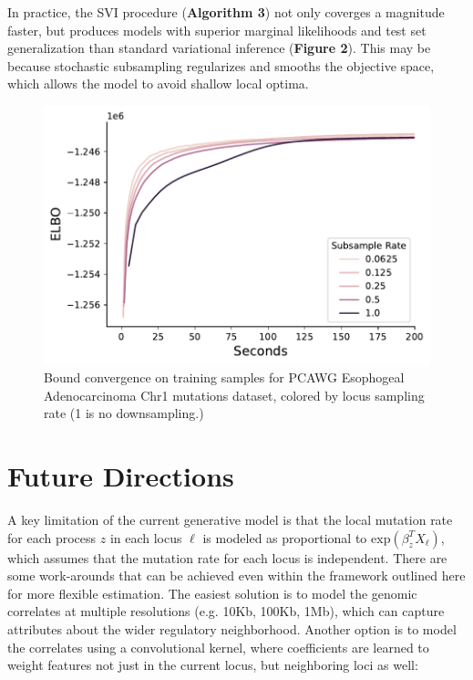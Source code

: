 \documentclass{article}
\begin{document}
In practice, the SVI procedure (\textbf{Algorithm 3}) not only coverges a magnitude faster, but produces models with superior marginal likelihoods and test set generalization than standard variational inference (\textbf{Figure 2}). This may be because stochastic subsampling regularizes and smooths the objective space, which allows the model to avoid shallow local optima.

\begin{figure}[!htb] \label{svi_fig}
\caption{Bound convergence on training samples for PCAWG Esophogeal Adenocarcinoma Chr1 mutations dataset, colored by locus sampling rate (1 is no downsampling.)}
\centering
\includegraphics[scale=0.5]{svi_subsampling.pdf}
\end{figure}

\section{Future Directions}

A key limitation of the current generative model is that the local mutation rate for each process $z$ in each locus $\ell$ is modeled as proportional to $\textrm{exp}(\beta_z^T X_\ell)$, which assumes that the mutation rate for each locus is independent. There are some work-arounds that can be achieved even within the framework outlined here for more flexible estimation. The easiest solution is to model the genomic correlates at multiple resolutions (e.g. 10Kb, 100Kb, 1Mb), which can capture attributes about the wider regulatory neighborhood. Another option is to model the correlates using a convolutional kernel, where coefficients are learned to weight features not just in the current locus, but neighboring loci as well:
\end{document}
